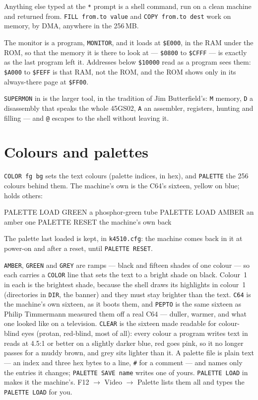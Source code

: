 \noindent Anything else typed at the \verb|*| prompt is a shell command,
run on a clean machine and returned from. \verb|FILL from.to value| and
\verb|COPY from.to dest| work on memory, by DMA, anywhere in the 256\,MB.

The monitor is a program, \texttt{MONITOR}, and it loads at
\texttt{\$E000}, in the RAM under the ROM, so that the memory it is there
to look at --- \texttt{\$0800} to \texttt{\$CFFF} --- is exactly as the
last program left it. Addresses below \texttt{\$10000} read as a program
sees them: \texttt{\$A000} to \texttt{\$FEFF} is that RAM, not the ROM,
and the ROM shows only in its always-there page at \texttt{\$FF00}.

\verb|SUPERMON| in  is the larger tool, in the tradition
of Jim Butterfield's: \verb|M| memory, \verb|D| a disassembly that speaks
the whole 45GS02, \verb|A| an assembler, registers, hunting and filling
--- and \verb|@| escapes to the shell without leaving it.

\section{Colours and palettes}
\verb|COLOR fg bg| sets the text colours (palette indices, in hex), and
\verb|PALETTE| the 256 colours behind them. The machine's own is the
C64's sixteen, yellow on blue;  holds others:

\begin{type}
PALETTE LOAD GREEN        a phosphor-green tube
PALETTE LOAD AMBER        an amber one
PALETTE RESET             the machine's own back
\end{type}

\noindent The palette last loaded is kept, in \texttt{k4510.cfg}: the
machine comes back in it at power-on and after a reset, until
\verb|PALETTE RESET|.

\noindent \texttt{AMBER}, \texttt{GREEN} and \texttt{GREY} are ramps ---
black and fifteen shades of one colour --- so each carries a
\verb|COLOR| line that sets the text to a bright shade on black. Colour~1
in each is the brightest shade, because the shell draws its highlights
in colour~1 (directories in \verb|DIR|, the banner) and they must stay
brighter than the text. \texttt{C64} is the machine's own sixteen, as
it boots them, and \texttt{PEPTO} is the same sixteen as Philip
Timmermann measured them off a real C64 --- duller, warmer, and what one
looked like on a television. \texttt{CLEAR} is the sixteen made
readable for colour-blind eyes (protan, red-blind, most of all): every
colour a program writes text in reads at 4.5:1 or better on a slightly
darker blue, red goes pink, so it no longer passes for a muddy brown,
and grey sits lighter than it. A palette file is
plain text --- an index and three hex bytes to a line, \verb|#| for a
comment --- and names only the entries it changes;
\verb|PALETTE SAVE name| writes one of yours. \verb|PALETTE LOAD| in 
makes it the machine's. F12 $\rightarrow$ Video $\rightarrow$ Palette lists them all and
types the \verb|PALETTE LOAD| for you.

